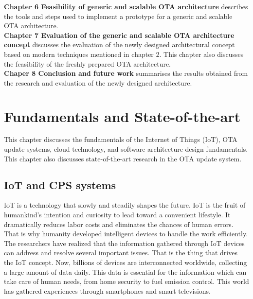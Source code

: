 \documentclass[12pt,a4paper]{article}
\begin{document}
\textbf{Chapter 6 Feasibility of generic and scalable OTA architecture} describes the tools and steps used to implement a prototype for a generic and scalable OTA architecture. \\

\textbf{Chapter 7 Evaluation of the generic and scalable OTA architecture concept} discusses the evaluation of the newly designed architectural concept based on modern techniques mentioned in chapter 2. This chapter also discusses the feasibility of the freshly prepared OTA architecture. \\

\textbf{Chaper 8 Conclusion and future work} summarises the results obtained from the research and evaluation of the newly designed architecture. \\


\newpage

\renewcommand{\baselinestretch}{1.5} %
\section{Fundamentals and State-of-the-art}

This chapter discusses the fundamentals of the Internet of Things (IoT), OTA update systems, cloud technology, and software architecture design fundamentals. This chapter also discusses state-of-the-art research in the OTA update system.

\subsection{IoT and CPS systems}

IoT is a technology that slowly and steadily shapes the future. IoT is the fruit of humankind's intention and curiosity to lead toward a convenient lifestyle. It dramatically reduces labor costs and eliminates the chances of human errors. That is why humanity developed intelligent devices to handle the work efficiently. The researchers have realized that the information gathered through IoT devices can address and resolve several important issues. That is the thing that drives the IoT concept. Now, billions of devices are interconnected worldwide, collecting a large amount of data daily. This data is essential for the information which can take care of human needs, from home security to fuel emission control. This world has gathered experiences through smartphones and smart televisions. \cite{r4} \\
\end{document}
